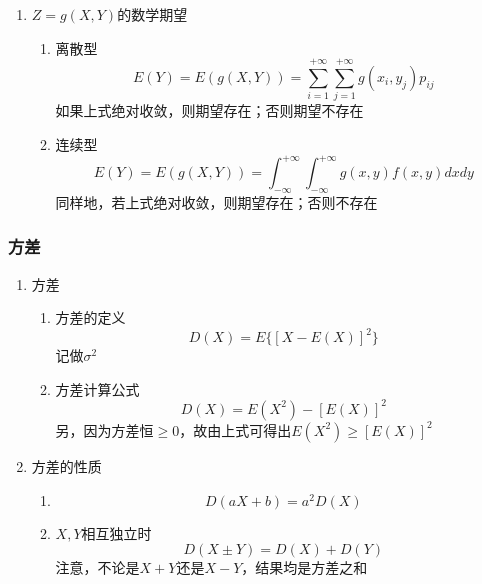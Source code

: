 \begin{enumerate}
	\item $Z=g(X,Y)$的数学期望
	\begin{enumerate}
		\item 离散型
			\begin{equation}
				E(Y) = E(g(X,Y)) = \sum_{i=1}^{+\infty}\sum_{j=1}^{+\infty} g(x_i, y_j)p_{ij}
			\end{equation}
			如果上式绝对收敛，则期望存在；否则期望不存在
		\item 连续型
			\begin{equation}
				E(Y) = E(g(X,Y)) = \int_{-\infty}^{+\infty}\int_{-\infty}^{+\infty}g(x,y)f(x,y)dxdy
			\end{equation}
			同样地，若上式绝对收敛，则期望存在；否则不存在
	\end{enumerate}
\end{enumerate}

\subsubsection{方差}
\begin{enumerate}
	\item 方差
	\begin{enumerate}
		\item 方差的定义
		\begin{equation}
			D(X) = E\{\left[X-E(X)\right]^2\}
		\end{equation}
		记做$\sigma^2$
		\item 方差计算公式
		\begin{equation}
			D(X) = E(X^2) - \left[ E(X) \right]^2
		\end{equation}
		另，因为方差恒$\geq 0$，故由上式可得出$E(X^2) \geq \left[ E(X) \right]^2$
	\end{enumerate}

	\item 方差的性质
	\begin{enumerate}
		\item 
		\begin{equation}
			D(aX+b) = a^2D(X)
		\end{equation}
		\item $X,Y$相互独立时
		\begin{equation}
			D(X\pm Y) = D(X) + D(Y)
		\end{equation}
		注意，不论是$X+Y$还是$X-Y$，结果均是方差之和
	\end{enumerate}
\end{enumerate}

